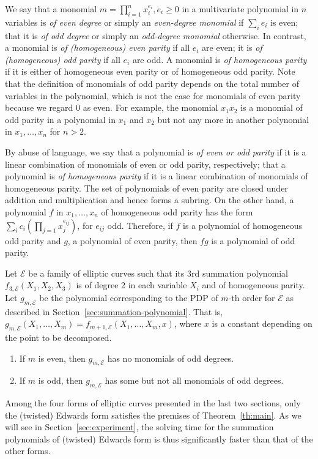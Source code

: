 We say that a monomial $m=\prod_{i=1}^n x_i^{e_i},e_i\geq 0$ in a
multivariate polynomial in $n$ variables is \emph{of even degree} or
simply an \emph{even-degree monomial} if $\sum_i e_i$ is even; that it
is \emph{of odd degree} or simply an \emph{odd-degree monomial}
otherwise.
%
In contrast, a monomial is \emph{of (homogeneous) even parity} if all
$e_i$ are even; it is \emph{of (homogeneous) odd parity} if all $e_i$
are odd.
%
A monomial is \emph{of homogeneous parity} if it is either of
homogeneous even parity or of homogeneous odd parity.
%
Note that the definition of monomials of odd parity depends on the
total number of variables in the polynomial, which is not the case for
monomials of even parity because we regard 0 as even.
%
For example, the monomial $x_1x_2$ is a monomial of odd parity in a
polynomial in $x_1$ and $x_2$ but not any more in another polynomial
in $x_1,\ldots,x_n$ for $n>2$.

By abuse of language, we say that a polynomial is \emph{of even or odd
  parity} if it is a linear combination of monomials of even or odd
parity, respectively; that a polynomial is \emph{of homogeneous
  parity} if it is a linear combination of monomials of homogeneous
parity.
%
The set of polynomials of even parity are closed under addition and
multiplication and hence forms a subring.
%
On the other hand, a polynomial $f$ in $x_1,\ldots,x_n$ of homogeneous
odd parity has the form
$\sum_i c_i\left(\prod_{j=1} x_j^{e_{ij}}\right)$, for $e_{ij}$ odd.
%
Therefore, if $f$ is a polynomial of homogeneous odd parity and $g$, a
polynomial of even parity, then $fg$ is a polynomial of odd parity.

\begin{theorem}
  \label{th:main}
  Let $\mathcal E$ be a family of elliptic curves such that its 3rd
  summation polynomial $f_{3,\mathcal E}(X_1,X_2,X_3)$ is of degree 2
  in each variable $X_i$ and of homogeneous parity.
  Let $g_{m,\mathcal E}$ be the polynomial corresponding to the PDP of
  $m$-th order for $\mathcal E$ as described in
  Section~\ref{sec:summation-polynomial}.
  That is,
  $g_{m,\mathcal E}(X_1,\ldots,X_m)=f_{m+1,\mathcal
    E}(X_1,\ldots,X_m,x)$, where $x$ is a constant depending on the
  point to be decomposed.
  \begin{enumerate}
  \item If $m$ is even, then $g_{m,\mathcal E}$ has no monomials of
    odd degrees.
  \item If $m$ is odd, then $g_{m,\mathcal E}$ has some but not all
    monomials of odd degrees.
  \end{enumerate}
\end{theorem}
%
Among the four forms of elliptic curves presented in the last two
sections, only the (twisted) Edwards form satisfies the premises of
Theorem~\ref{th:main}.
%
As we will see in Section~\ref{sec:experiment}, the solving time for
the summation polynomials of (twisted) Edwards form is thus
significantly faster than that of the other forms.

